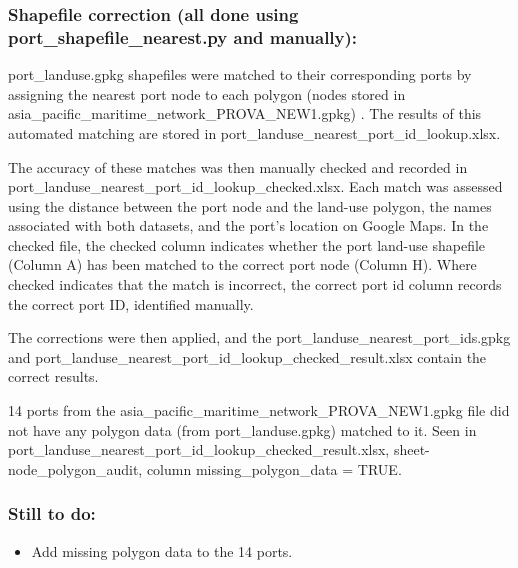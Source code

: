 \documentclass[11pt,a4paper]{article}
\begin{document}
\subsubsection{Shapefile correction (all done using port\_shapefile\_nearest.py and manually):}

port\_landuse.gpkg shapefiles were matched to their corresponding ports by assigning the nearest port node to each polygon (nodes stored in asia\_pacific\_maritime\_network\_PROVA\_NEW1.gpkg) . The results of this automated matching are stored in port\_landuse\_nearest\_port\_id\_lookup.xlsx.\par



The accuracy of these matches was then manually checked and recorded in port\_landuse\_nearest\_port\_id\_lookup\_checked.xlsx. Each match was assessed using the distance between the port node and the land-use polygon, the names associated with both datasets, and the port's location on Google Maps. In the checked file, the checked column indicates whether the port land-use shapefile (Column A) has been matched to the correct port node (Column H). Where checked indicates that the match is incorrect, the correct port id column records the correct port ID, identified manually.\par



The corrections were then applied, and the port\_landuse\_nearest\_port\_ids.gpkg and port\_landuse\_nearest\_port\_id\_lookup\_checked\_result.xlsx contain the correct results.\par



14 ports from the asia\_pacific\_maritime\_network\_PROVA\_NEW1.gpkg file did not have any polygon data (from port\_landuse.gpkg) matched to it. Seen in port\_landuse\_nearest\_port\_id\_lookup\_checked\_result.xlsx, sheet-node\_polygon\_audit, column missing\_polygon\_data = TRUE.\par



\subsubsection{Still to do:}

\begin{itemize}
\item Add missing polygon data to the 14 ports.
\end{itemize}
\end{document}
